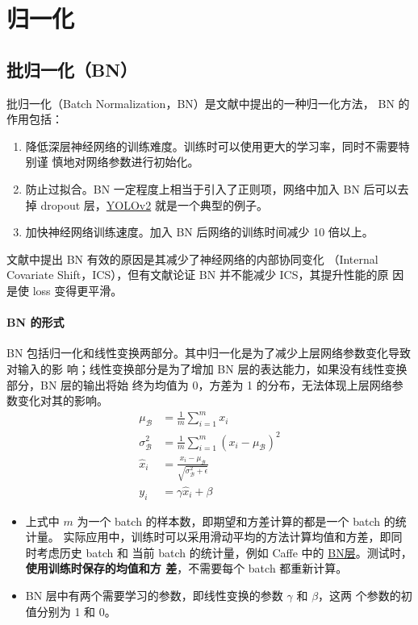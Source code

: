 \section{归一化}

\subsection{批归一化（BN）}
\label{sub:BN}

批归一化（Batch Normalization，BN）是文献中提出的一种归一化方法，
BN 的作用包括：

\begin{enumerate}
  \item 降低深层神经网络的训练难度。训练时可以使用更大的学习率，同时不需要特别谨
    慎地对网络参数进行初始化。
  \item 防止过拟合。BN 一定程度上相当于引入了正则项，网络中加入 BN 后可以去
    掉 dropout 层，\hyperref[subsec:YOLOv2]{YOLOv2} 就是一个典型的例子。
  \item 加快神经网络训练速度。加入 BN 后网络的训练时间减少 10 倍以上。
\end{enumerate}

文献中提出 BN 有效的原因是其减少了神经网络的内部协同变化
（Internal Covariate Shift，ICS），但有文献论证 BN 并不能减少 ICS，其提升性能的原
因是使 loss 变得更平滑。

\paragraph{BN 的形式}
BN 包括归一化和线性变换两部分。其中归一化是为了减少上层网络参数变化导致对输入的影
响；线性变换部分是为了增加 BN 层的表达能力，如果没有线性变换部分，BN 层的输出将始
终为均值为 0，方差为 1 的分布，无法体现上层网络参数变化对其的影响。
\begin{align}
  \label{equ:BN}
  \mu_{\mathcal{B}} & = \frac{1}{m} \sum_{i=1}^{m} x_i \\
  \sigma_{\mathcal{B}}^2 & = \frac{1}{m} \sum_{i=1}^{m} (x_i-\mu_{\mathcal{B}})^2 \\
  \hat{x}_i & = \frac{x_i - \mu_{\mathcal{B}}}{\sqrt{\sigma_{\mathcal{B}}^2 + \epsilon}} \\
  y_i & = \gamma \hat{x}_i + \beta
\end{align}

\begin{itemize}
\item 上式中 $m$ 为一个 batch 的样本数，即期望和方差计算的都是一个 batch 的统计量。
  实际应用中，训练时可以采用滑动平均的方法计算均值和方差，即同时考虑历史 batch 和
  当前 batch 的统计量，例如 Caffe 中的
  \href{https://bit.ly/2JBY7aw}{BN层}。测试时，\textbf{使用训练时保存的均值和方
    差}，不需要每个 batch 都重新计算。
  \item BN 层中有两个需要学习的参数，即线性变换的参数 $\gamma$ 和 $\beta$，这两
    个参数的初值分别为 1 和 0。
\end{itemize}


